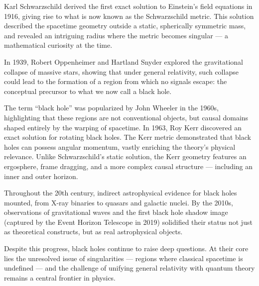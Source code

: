 \begin{historical}
Karl Schwarzschild derived the first exact solution to Einstein's field equations in 1916, giving rise to what is now known as the Schwarzschild metric. This solution described the spacetime geometry outside a static, spherically symmetric mass, and revealed an intriguing radius where the metric becomes singular — a mathematical curiosity at the time.

In 1939, Robert Oppenheimer and Hartland Snyder explored the gravitational collapse of massive stars, showing that under general relativity, such collapse could lead to the formation of a region from which no signals escape: the conceptual precursor to what we now call a black hole.

The term “black hole” was popularized by John Wheeler in the 1960s, highlighting that these regions are not conventional objects, but causal domains shaped entirely by the warping of spacetime. In 1963, Roy Kerr discovered an exact solution for rotating black holes. The Kerr metric demonstrated that black holes can possess angular momentum, vastly enriching the theory’s physical relevance. Unlike Schwarzschild’s static solution, the Kerr geometry features an ergosphere, frame dragging, and a more complex causal structure — including an inner and outer horizon.

Throughout the 20th century, indirect astrophysical evidence for black holes mounted, from X-ray binaries to quasars and galactic nuclei. By the 2010s, observations of gravitational waves and the first black hole shadow image (captured by the Event Horizon Telescope in 2019) solidified their status not just as theoretical constructs, but as real astrophysical objects.

Despite this progress, black holes continue to raise deep questions. At their core lies the unresolved issue of singularities — regions where classical spacetime is undefined — and the challenge of unifying general relativity with quantum theory remains a central frontier in physics.
\end{historical}